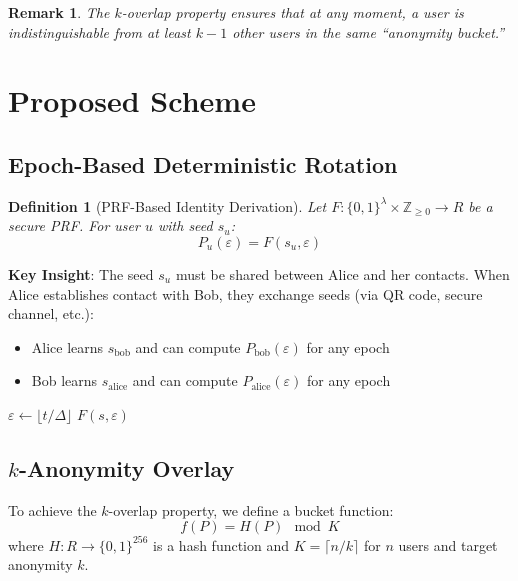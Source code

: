\documentclass[11pt]{article}
\newtheorem{definition}[theorem]{Definition}
\newtheorem{remark}[theorem]{Remark}
\newcommand{\epoch}{\varepsilon}
\begin{document}
\begin{remark}
The $k$-overlap property ensures that at any moment, a user is indistinguishable
from at least $k-1$ other users in the same ``anonymity bucket.''
\end{remark}

\section{Proposed Scheme}

\subsection{Epoch-Based Deterministic Rotation}

\begin{definition}[PRF-Based Identity Derivation]
Let $F: \{0,1\}^{\lambda} \times \mathbb{Z}_{\geq 0} \to R$ be a secure PRF.
For user $u$ with seed $s_u$:
\[
P_u(\epoch) = F(s_u, \epoch)
\]
\end{definition}

\textbf{Key Insight}: The seed $s_u$ must be shared between Alice and her contacts.
When Alice establishes contact with Bob, they exchange seeds (via QR code, secure channel, etc.):
\begin{itemize}
    \item Alice learns $s_{\text{bob}}$ and can compute $P_{\text{bob}}(\epoch)$ for any epoch
    \item Bob learns $s_{\text{alice}}$ and can compute $P_{\text{alice}}(\epoch)$ for any epoch
\end{itemize}

\begin{algorithm}
\caption{Deterministic Identity Rotation}
\begin{algorithmic}[1]
    \State $\epoch \gets \lfloor t / \Delta \rfloor$
    \State \Return $F(s, \epoch)$ 
\EndProcedure
\end{algorithmic}
\end{algorithm}

\subsection{$k$-Anonymity Overlay}

To achieve the $k$-overlap property, we define a bucket function:
\[
f(P) = H(P) \mod K
\]
where $H: R \to \{0,1\}^{256}$ is a hash function and $K = \lceil n / k \rceil$
for $n$ users and target anonymity $k$.
\end{document}
